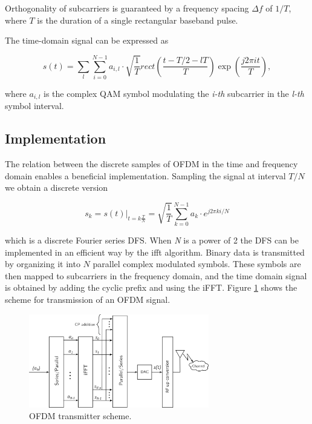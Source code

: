 Orthogonality of subcarriers is guaranteed by a frequency spacing $\Delta f$ of $1/T$, where $T$ is the duration of a single rectangular baseband pulse.

The time-domain signal can be expressed as

\begin{equation*}
    s(t) = \sum_l\sum_{i=0}^{N-1} a_{i,l}\cdot \sqrt{\frac{1}{T}} rect \left( \frac{t-T/2 - lT}{T} \right)\exp{\left(\frac{j2\pi it}{T}\right)},
\end{equation*}

where $a_{i,l}$ is the complex QAM symbol modulating the \textit{i-th} subcarrier in the \textit{l-th} symbol interval.

\subsection{Implementation}
The relation between the discrete samples of OFDM in the time and frequency domain enables a beneficial implementation.
Sampling the signal at interval $T/N$ we obtain a discrete version

\begin{equation*}
    s_k = s(t)|_{t=k \frac{T}{N}} = \sqrt{\frac{1}{T}}\sum_{k=0}^{N-1} a_k \cdot e^{j2\pi ki/N}
\end{equation*}

which is a discrete Fourier series DFS. When \textit{N} is a power of 2 the DFS can be implemented in an efficient way by the \gls{ifft} algorithm.
Binary data is transmitted by organizing it into $N$ parallel complex modulated symbols. These symbols are then mapped to subcarriers in the frequency domain, and the time domain signal is obtained by adding the cyclic prefix and using the iFFT. Figure \ref{fig:ofdm_transmit} shows the scheme for transmission of an OFDM signal.

\begin{figure}[H]
	\centering
	\includegraphics[width=0.7\textwidth]{Images/theoretical/ofdm/ofdm_transmit.png}
	\caption{OFDM transmitter scheme.}
	\label{fig:ofdm_transmit}
\end{figure}


